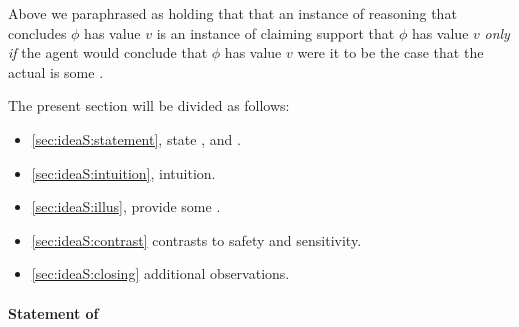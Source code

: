 \begin{note}
  Above we paraphrased \ideaS{} as holding that that an instance of reasoning that concludes \(\phi\) has value \(v\) is an instance of claiming support that \(\phi\) has value \(v\) \emph{only if} the agent would conclude that \(\phi\) has value \(v\) were it to be the case that the actual \world{} is some \epPW{}.
\end{note}


\begin{note}
  The present section will be divided as follows:
  \begin{itemize}
  \item \autoref{sec:ideaS:statement}, state \ideaS{}, and \sink{}.
  \item \autoref{sec:ideaS:intuition}, intuition.
  \item \autoref{sec:ideaS:illus}, provide some .
  \item \autoref{sec:ideaS:contrast} contrasts to safety and sensitivity.
  \item \autoref{sec:ideaS:closing} additional observations.
  \end{itemize}
\end{note}

\paragraph{Statement of \ideaS{}}
\label{sec:ideaS:statement}

